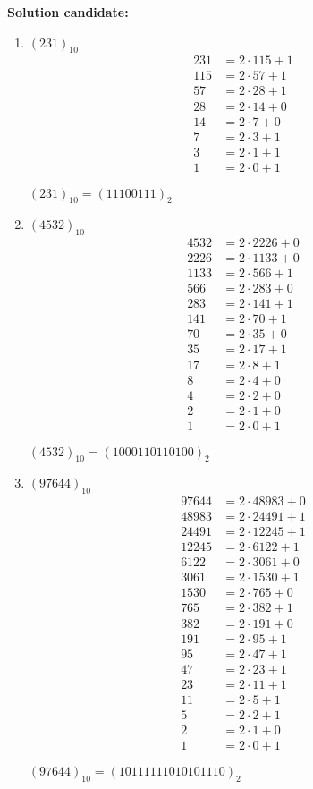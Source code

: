 \documentclass{report}
\newcommand{\cent}[1]{\begin{center}#1\end{center}}
\newcommand{\mAlign}[1]{\begin{align*}#1\end{align*}}
\newcommand{\solution}{\textbf{Solution candidate: }}
\newcommand{\defaultEnumerateLabel}{\textbf{\alph*.}}
\newcommand{\myItem}[1]{\item #1\\}
\newcommand{\decimal}[1]{(#1)_{10}}
\newcommand{\binary}[1]{(#1)_2}
\begin{document}
\begin{enumerate}[label=\defaultEnumerateLabel]
	\solution
	
	\begin{enumerate}[label= \defaultEnumerateLabel]
		\myItem{$\decimal{231}$}
		
		\mAlign{
			231 &= 2 \cdot 115+1 \\
			115 &= 2 \cdot 57 + 1 \\
			57 &= 2 \cdot 28 + 1 \\
			28 &= 2 \cdot 14 + 0 \\
			14 &= 2 \cdot 7 + 0 \\
			7 &= 2 \cdot 3 + 1 \\
			3 &= 2 \cdot 1 + 1 \\
			1 &= 2 \cdot 0 + 1}
		
		\cent{$ \decimal{231}=\binary{11100111}$}
		
		\myItem{$\decimal{4532}$}
		
		\mAlign{
			4532 &= 2 \cdot 2226 + 0 \\
			2226 &= 2 \cdot 1133 + 0 \\
			1133 &= 2 \cdot 566 + 1 \\
			566 &= 2 \cdot 283 + 0\\
			283 &= 2 \cdot 141 + 1 \\
			141 &= 2 \cdot 70 + 1 \\
			70 &= 2 \cdot 35 + 0 \\
			35 &= 2 \cdot 17 + 1 \\
			17 &= 2 \cdot 8 + 1\\
			8 &= 2 \cdot 4 + 0 \\
			4 &= 2 \cdot 2 + 0 \\
			2 &= 2 \cdot 1 + 0 \\
			1 &= 2 \cdot 0 + 1
		}
		
		\cent{$\decimal{4532} = \binary{1000110110100}$}
		
		\myItem{$\decimal{97644}$}
		\mAlign{
			97644 &= 2 \cdot 48983+ 0 \\
			48983 &= 2 \cdot 24491 + 1 \\
			24491 &= 2 \cdot 12245 + 1 \\
			12245 &= 2 \cdot 6122 + 1 \\
			6122 &= 2 \cdot 3061 + 0 \\
			3061 &= 2 \cdot 1530 + 1 \\
			1530 &= 2 \cdot 765 + 0\\
			765 &= 2 \cdot 382 + 1 \\
			382 &= 2 \cdot 191 + 0 \\
			191 &= 2 \cdot 95 + 1 \\
			95 &= 2 \cdot 47 + 1 \\
			47 &= 2 \cdot 23 + 1 \\
			23 &= 2 \cdot 11 + 1 \\
			11 &= 2 \cdot 5 + 1 \\
			5 &= 2 \cdot 2 + 1 \\
			2 &= 2 \cdot 1 + 0 \\
			1 &= 2 \cdot 0 + 1
		}
	\cent{$\decimal{97644} = \binary{10111111010101110}$}
	\end{enumerate}
	

\end{enumerate}
\end{document}
